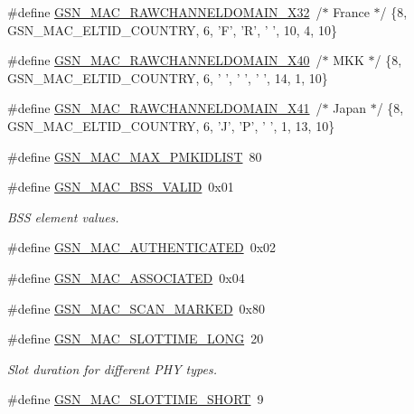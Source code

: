 \begin{DoxyCompactItemize}
\item 
\#define \hyperlink{a00642_gae1d4ccda0a4874b368916cf6bffd8dd9}{GSN\_\-MAC\_\-RAWCHANNELDOMAIN\_\-X32}~/$\ast$ France $\ast$/ \{8, GSN\_\-MAC\_\-ELTID\_\-COUNTRY, 6, 'F', 'R', ' ', 10, 4, 10\}
\item 
\#define \hyperlink{a00642_ga438fdc847fa4e621ec8496edb440b33d}{GSN\_\-MAC\_\-RAWCHANNELDOMAIN\_\-X40}~/$\ast$ MKK    $\ast$/ \{8, GSN\_\-MAC\_\-ELTID\_\-COUNTRY, 6, ' ', ' ', ' ', 14, 1, 10\}
\item 
\#define \hyperlink{a00642_gad8ce3e93cc664b42d72189d4cbec214c}{GSN\_\-MAC\_\-RAWCHANNELDOMAIN\_\-X41}~/$\ast$ Japan  $\ast$/ \{8, GSN\_\-MAC\_\-ELTID\_\-COUNTRY, 6, 'J', 'P', ' ', 1, 13, 10\}
\item 
\#define \hyperlink{a00642_ga9f42c86bf65bb1ba654fb772cc494637}{GSN\_\-MAC\_\-MAX\_\-PMKIDLIST}~80
\end{DoxyCompactItemize}
\begin{DoxyCompactItemize}
\item 
\#define \hyperlink{a00642_ga98d81e9fac7e3e57bb933a0e8774312b}{GSN\_\-MAC\_\-BSS\_\-VALID}~0x01
\begin{DoxyCompactList}\small\item\em BSS element values. \end{DoxyCompactList}\item 
\#define \hyperlink{a00642_ga11cf8c8f47218aaccfe9b0342ad34b1a}{GSN\_\-MAC\_\-AUTHENTICATED}~0x02
\item 
\#define \hyperlink{a00642_gac95d79b5108d9696c78d41bf0bfc5f62}{GSN\_\-MAC\_\-ASSOCIATED}~0x04
\item 
\#define \hyperlink{a00642_gaa8c55e757f0ecc6201c7a9db8808da39}{GSN\_\-MAC\_\-SCAN\_\-MARKED}~0x80
\end{DoxyCompactItemize}
\begin{DoxyCompactItemize}
\item 
\#define \hyperlink{a00642_gaf9a051751a39d7ec6cf8e671deafd3ff}{GSN\_\-MAC\_\-SLOTTIME\_\-LONG}~20
\begin{DoxyCompactList}\small\item\em Slot duration for different PHY types. \end{DoxyCompactList}\item 
\#define \hyperlink{a00642_ga081f6423e4f0a7752d2a289c9a7eedbc}{GSN\_\-MAC\_\-SLOTTIME\_\-SHORT}~9
\end{DoxyCompactItemize}
